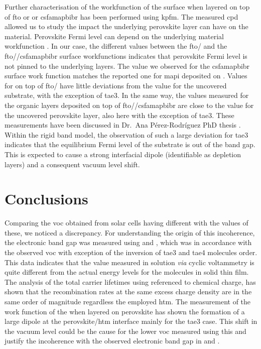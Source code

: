 	Further characterisation of the workfunction of the  surface when layered on top of \gls{fto} or  or \gls{csfamapbibr} has been performed using \gls{kpfm}.
	The measured \gls{cpd} allowed us to study the impact the underlying perovskite layer can have on the  material.
	Perovskite Fermi level can depend on the underlying material workfunction \cite{Miller2014,Olthof2017}.
	In our case, the different values between the \gls{fto}\-/ and the \gls{fto}\-/\-/\gls{csfamapbibr} surface workfunctions indicates that perovskite Fermi level is not pinned to the underlying layers.
	The value we observed for the \gls{csfamapbibr} surface work function matches the reported one for \gls{mapi} deposited on  \cite{Miller2014}.
	Values for  on top of \gls{fto}\-/ have little deviations from the value for the uncovered substrate, with the exception of \gls{tae3}.
	In the same way, the values measured for the organic layers deposited on top of \gls{fto}\-/\-/\gls{csfamapbibr} are close to the value for the uncovered perovskite layer, also here with the exception of \gls{tae3}.
	These measurements have been discussed in Dr.\ Ana Pérez\hyp{}Rodríguez PhD thesis \cite{Perez-Rodriguez2018}.
	Within the rigid band model, the observation of such a large deviation for \gls{tae3} indicates that the equilibrium Fermi level of the substrate is out of the  band gap.
	This is expected to cause a strong interfacial dipole (identifiable as depletion layers) and a consequent vacuum level shift.

\section{Conclusions}
	Comparing the \gls{voc} obtained from solar cells having different  with the  values of these, we noticed a discrepancy.
	For understanding the origin of this incoherence, the electronic band gap was measured using  and , which was in accordance with the observed \gls{voc} with exception of the inversion of \gls{tae3} and \gls{tae4} molecules order.
	This data indicates that the  value measured in solution \textsl{via} cyclic voltammetry is quite different from the actual energy levels for the molecules in solid thin film.
	The analysis of the total carrier lifetimes using  referenced to chemical charge, has shown that the recombination rates at the same excess charge density are in the same order of magnitude regardless the employed \gls{htm}.
	The measurement of the work function of the  when layered on perovskite has shown the formation of a large dipole at the perovskite\-/\gls{htm} interface mainly for the \gls{tae3} case.
	This shift in the vacuum level could be the cause for the lower \gls{voc} measured using this  and justify the incoherence with the observed electronic band gap in  and .
